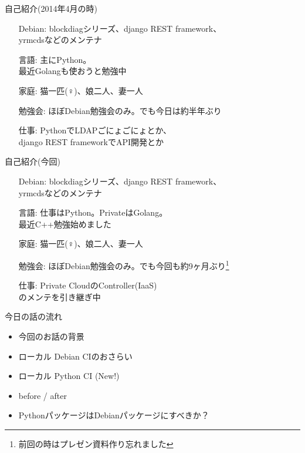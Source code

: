 
\frame{\titlepage{}}

\begin{frame}{自己紹介(2014年4月の時)}
 \begin{itemize}
  \item[Debian:] blockdiagシリーズ、django REST framework、\\yrmcdsなどのメンテナ
  \item[言語:] 主にPython。\\最近Golangも使おうと勉強中
  \item[家庭:] 猫一匹(♀)、娘二人、妻一人
  \item[勉強会:] ほぼDebian勉強会のみ。でも今日は約半年ぶり
  \item[仕事:] PythonでLDAPごにょごにょとか、\\django REST frameworkでAPI開発とか
 \end{itemize}
\end{frame}

\begin{frame}{自己紹介(今回)}
 \begin{itemize}
  \item[Debian:] blockdiagシリーズ、django REST framework、\\yrmcdsなどのメンテナ
  \item[言語:] 仕事はPython。PrivateはGolang。\\最近C++勉強始めました
  \item[家庭:] 猫一匹(♀)、娘二人、妻一人
  \item[勉強会:] ほぼDebian勉強会のみ。でも今回も約9ヶ月ぶり\footnote{前回の時はプレゼン資料作り忘れました}
  \item[仕事:] Private CloudのController(IaaS)\\のメンテを引き継ぎ中
 \end{itemize}
\end{frame}

\begin{frame}{今日の話の流れ}
  \begin{itemize}
  \item 今回のお話の背景
  \item ローカル Debian CIのおさらい
  \item ローカル Python CI (New!)
  \item before / after
  \item PythonパッケージはDebianパッケージにすべきか？
\end{itemize}
\end{frame}

